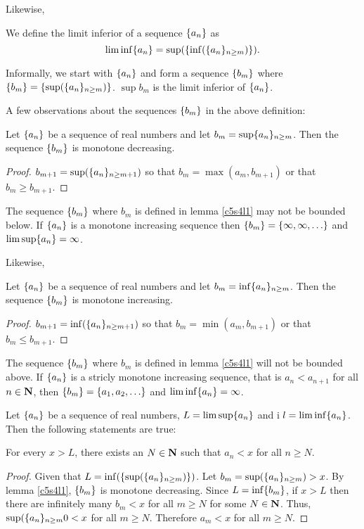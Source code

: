 Likewise,
\begin{defn}\label{c5s4d3}
We define the limit inferior of a sequence $\{a_n\}$ as
\[
\liminf\{a_n\} = \sup(\{\inf(\{a_n\}_{n \ge m})\}).
\]
\end{defn}
Informally, we start with $\{a_n\}$ and form a sequence $\{b_m\}$ where
$\{b_m\} = \{\sup(\{a_n\}_{n \ge m})\}$. $\sup{b_m}$ is the limit 
inferior of $\{a_n\}$.

A few observations about the sequences $\{b_m\}$ in the above definition:
\begin{lem}\label{c5s4l1}
Let $\{a_n\}$ be a sequence of real numbers and let $b_m = \sup\{
{a_n}\}_{n \ge m}$. Then the sequence $\{b_m\}$ is monotone decreasing.
\end{lem}
\begin{proof}
$b_{m + 1} = \sup(\{a_n\}_{n \ge m + 1})$ so that $b_m = \max(a_m, 
b_{m+1})$ or that $b_m \ge b_{m+1}$.
\end{proof}

\begin{rem}
The sequence $\{b_m\}$ where $b_m$ is defined in lemma \ref{c5s4l1} may
not be bounded below. If $\{a_n\}$ is a monotone increasing sequence then
$\{b_m\} = \{\infty, \infty, \ldots\}$ and $\limsup\{a_n\} = \infty$.
\end{rem}

Likewise,
\begin{lem}\label{c5s4l2}
Let $\{a_n\}$ be a sequence of real numbers and let $b_m = \inf\{
{a_n}\}_{n \ge m}$. Then the sequence $\{b_m\}$ is monotone increasing.
\end{lem}
\begin{proof}
$b_{m + 1} = \inf(\{a_n\}_{n \ge m + 1})$ so that $b_m = \min(a_m, 
b_{m+1})$ or that $b_m \le b_{m+1}$.
\end{proof}

\begin{rem}
The sequence $\{b_m\}$ where $b_m$ is defined in lemma \ref{c5s4l1} will
not be bounded above. If $\{a_n\}$ is a stricly monotone increasing 
sequence, that is $a_n < a_{n + 1}$ for all $n \in \mathbf{N}$, then
$\{b_m\} = \{a_1, a_2, \ldots\}$ and $\liminf\{a_n\} = \infty$.
\end{rem}

Let $\{a_n\}$ be a sequence of real numbers, $L = \limsup\{a_n\}$ and i
$l = \liminf\{a_n\}$. Then the following statements are true:
\begin{lem}\label{c5s4l3}
For every $x > L$, there exists an $N \in \mathbf{N}$ such that $a_n < x$ for
all $n \ge N$.
\end{lem}
\begin{proof}
Given that $L = \inf(\{\sup(\{a_n\}_{n \ge m})\})$. Let $b_m = 
\sup(\{a_n\}_{n \ge m}) > x$. By lemma \ref{c5s4l1}, $\{b_m\}$ is 
monotone decreasing. Since $L = \inf\{b_m\}$, if $x > L$ then there are
infinitely many $b_m < x$ for all $m \ge N$ for some $N \in \mathbf{N}$. Thus,
$\sup(\{a_n\}_{n \ge m}0 < x$ for all $m \ge N$. Therefore $a_m < x$ for
all $m \ge N$.
\end{proof}

